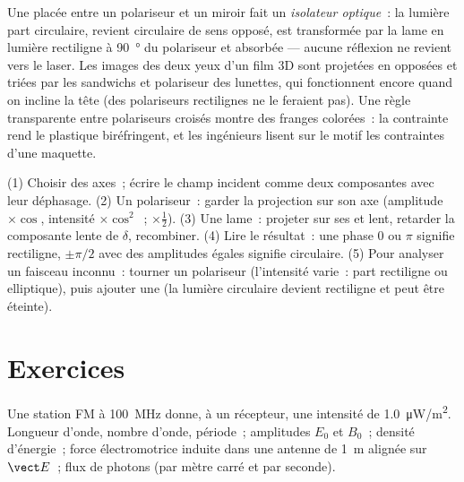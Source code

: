 \begin{example}\label{ex:b2:plane-waves-polarization:plateuses}
Une  placée entre un polariseur et un miroir fait un
\emph{isolateur optique}~: la lumière part circulaire, revient
circulaire de sens opposé, est transformée par la lame en lumière
rectiligne à \qty{90}{\degree} du polariseur et absorbée --- aucune
réflexion ne revient vers le laser. Les images des deux yeux d'un film 3D sont
projetées en  opposées et triées par les
sandwichs  et polariseur des lunettes, qui fonctionnent encore
quand on incline la tête (des polariseurs rectilignes ne le feraient pas). Une règle
transparente entre polariseurs croisés montre des franges colorées~: la contrainte rend
le plastique biréfringent, et les ingénieurs lisent sur le motif les contraintes d'une maquette.
\end{example}

\begin{method}\label{met:b2:plane-waves-polarization:method}
(1) Choisir des axes~; écrire le champ incident comme deux composantes avec
leur déphasage. (2) Un polariseur~: garder la projection sur son
axe (amplitude $\times\cos$, intensité $\times\cos^2$~; 
$\times\tfrac12$). (3) Une lame~: projeter sur ses  et lent, retarder
la composante lente de $\delta$, recombiner. (4) Lire le résultat~: une phase $0$ ou $\pi$
signifie rectiligne, $\pm\pi/2$ avec des amplitudes égales signifie circulaire. (5) Pour
analyser un faisceau inconnu~: tourner un polariseur (l'intensité varie~: part rectiligne
ou elliptique), puis ajouter une  (la lumière circulaire devient
rectiligne et peut être éteinte).
\end{method}

\section{Exercices}

\begin{exercise}[$\star$]\label{exo:b2:plane-waves-polarization:1}
Une station FM à \qty{100}{MHz} donne, à un récepteur, une intensité de
\qty{1.0}{\micro W/m^2}. Longueur d'onde, nombre d'onde, période~; amplitudes $E_0$ et
$B_0$~; densité d'énergie~; force électromotrice induite dans une antenne de \qty{1}{m} alignée sur
$\vect E$~; flux de photons (par mètre carré et par seconde).
\end{exercise}

